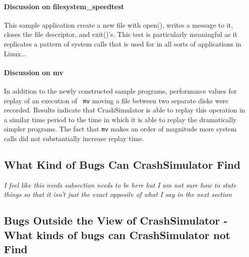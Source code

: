         \paragraph{Discussion on filesystem\_speedtest}

        This sample application create a new file with open(), writes a message to it, closes the file descriptor, and
        exit()'s. This test is particularly meaningful as it replicates a pattern of system calls that is used for in
        all sorts of applications in Linux...

        \paragraph{Discussion on mv}

        In addition to the newly constructed sample programs, performance values for replay of an execution of {\tt
          mv} moving a file between two separate disks were recorded.  Results indicate that CrashSimulator is able to
        replay this operation in a similar time period to the time in which it is able to replay the dramatically
        simpler programs.  The fact that {\tt mv} makes an order of magnitude more system calls did not substantially
        increase replay time.

    \subsection{What Kind of Bugs Can CrashSimulator Find}

    \emph{I feel like this needs subsection needs to be here but I am not sure how to state things so that it isn't just
      the exact opposite of what I say in the next section}

    \subsection{Bugs Outside the View of CrashSimulator - What kinds of bugs can CrashSimulator not Find}

